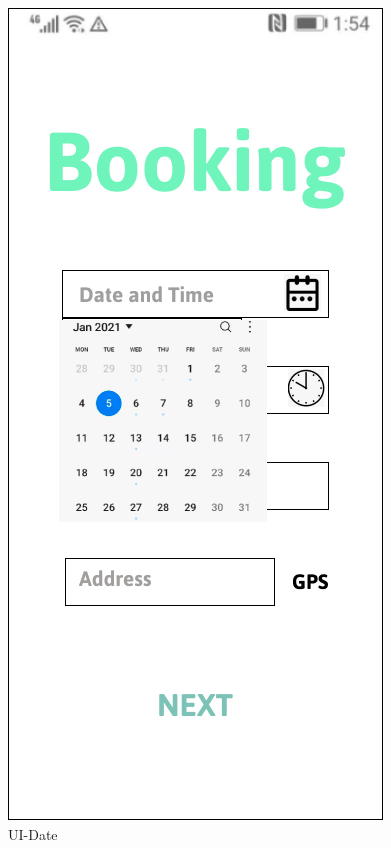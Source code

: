 \documentclass[a4paper,12pt]{report}
\begin{document}
\begin{figure}[H]
	\begin{minipage}[t]{0.56\linewidth}
		\centering
		\includegraphics[scale=0.5]{UI-Date}
		\caption{UI-Date}
		\label{fig:UI-Date}
	\end{minipage}%
	\begin{minipage}[t]{0.56\linewidth}
		\centering

\end{minipage}
\end{figure}
\end{document}
